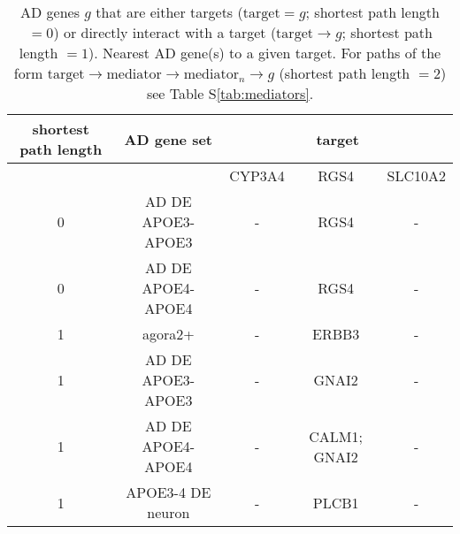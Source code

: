 \documentclass[letterpaper]{article}
\begin{document}
\begin{table}[p]
\begin{tabular}{cc||c|c|c}
\toprule
shortest path length   & AD gene set         &  \multicolumn{3}{c}{target}        \\
\midrule
                       &   {}                &  CYP3A4 &          RGS4 &  SLC10A2 \\
\midrule
                    0  &   AD DE APOE3-APOE3 &    -    &          RGS4 &    -     \\
                    0  &   AD DE APOE4-APOE4 &    -    &          RGS4 &    -     \\
\midrule
                    1  &   agora2+           &    -    &         ERBB3 &    -     \\
                    1  &   AD DE APOE3-APOE3 &    -    &         GNAI2 &    -     \\
                    1  &   AD DE APOE4-APOE4 &    -    &  CALM1; GNAI2 &    -     \\
                    1  &   APOE3-4 DE neuron &    -    &         PLCB1 &    -     \\
\bottomrule
\end{tabular}
\caption{
  AD genes $g$ that are either targets ($\mathrm{target} = g$; shortest path length $=0$) or directly
  interact with a target ($\mathrm{target} \rightarrow g$; shortest path length $=1$).
  Nearest AD gene(s) to a given target.  For paths of the form $\mathrm{target}
  \rightarrow \mathrm{mediator} \rightarrow
  \mathrm{mediator}_n \rightarrow g$ (shortest path length $= 2$) see Table
  S\ref{tab:mediators}.
}
\label{tab:nearest-ADgenes}
\end{table}
\end{document}
